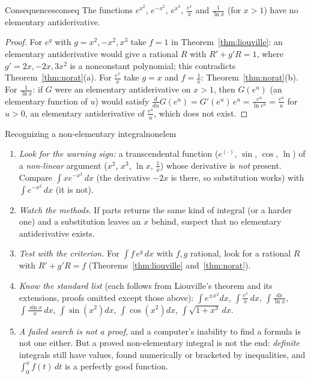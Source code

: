 \documentclass[11pt]{article}
\begin{document}
\begin{thm}{Consequences}{conseq}
The functions $e^{x^2}$, $e^{-x^2}$, $e^{x^3}$, $\frac{e^x}x$ and $\frac1{\ln x}$ (for $x>1$) have no elementary antiderivative.
\end{thm}
\begin{proof}
For $e^{g}$ with $g=x^2,-x^2,x^3$ take $f=1$ in Theorem~\ref{thm:liouville}: an elementary antiderivative would give a rational $R$ with $R'+g'R=1$, where $g'=2x,-2x,3x^2$ is a nonconstant polynomial; this contradicts Theorem~\ref{thm:norat}(a). For $\frac{e^x}x$ take $g=x$ and $f=\frac1x$: Theorem~\ref{thm:norat}(b). For $\frac1{\ln x}$: if $G$ were an elementary antiderivative on $x>1$, then $G(e^u)$ (an elementary function of $u$) would satisfy $\frac d{du}G(e^u)=G'(e^u)\,e^u=\frac{e^u}{\ln e^u}=\frac{e^u}u$ for $u>0$, an elementary antiderivative of $\frac{e^u}u$, which does not exist.
\end{proof}

\begin{proc}{Recognizing a non-elementary integral}{nonelem}
\begin{enumerate}[nosep]
  \item \emph{Look for the warning sign:} a transcendental function ($e^{(\cdot)}$, $\sin$, $\cos$, $\ln$) of a \emph{non-linear} argument ($x^2$, $x^3$, $\ln x$, $\frac1x$) whose derivative is \emph{not} present. Compare $\int xe^{-x^2}\,dx$ (the derivative $-2x$ is there, so substitution works) with $\int e^{-x^2}\,dx$ (it is not).
  \item \emph{Watch the methods.} If parts returns the same kind of integral (or a harder one) and a substitution leaves an $x$ behind, suspect that no elementary antiderivative exists.
  \item \emph{Test with the criterion.} For $\int f\,e^g\,dx$ with $f,g$ rational, look for a rational $R$ with $R'+g'R=f$ (Theorems~\ref{thm:liouville} and~\ref{thm:norat}).
  \item \emph{Know the standard list} (each follows from Liouville's theorem and its extensions, proofs omitted except those above): $\int e^{\pm x^2}dx$, $\int\frac{e^x}x\,dx$, $\int\frac{dx}{\ln x}$, $\int\frac{\sin x}x\,dx$, $\int\sin\left(x^2\right)dx$, $\int\cos\left(x^2\right)dx$, $\int\sqrt{1+x^3}\,dx$.
  \item \emph{A failed search is not a proof}, and a computer's inability to find a formula is not one either. But a proved non-elementary integral is not the end: \emph{definite} integrals still have values, found numerically or bracketed by inequalities, and $\int_0^xf(t)\,dt$ is a perfectly good function.
\end{enumerate}
\end{proc}
\end{document}
